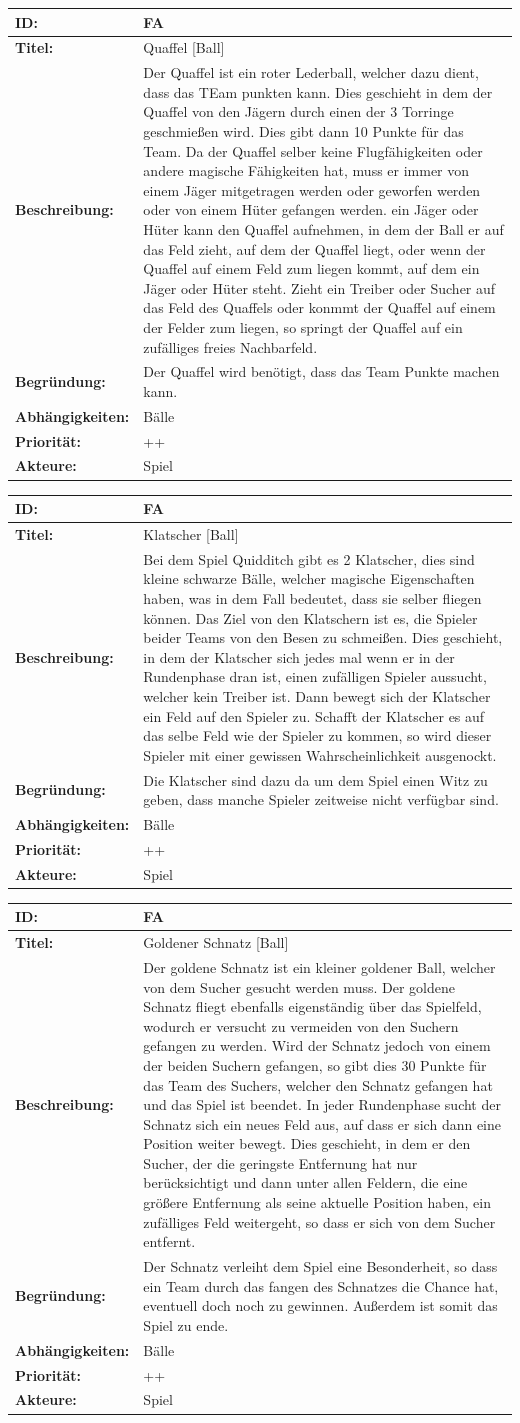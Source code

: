 \documentclass[a4paper,12pt,
headsepline,           %
oneside,               %
pointlessnumbers,      %
bibtotoc,              %
]{scrartcl}
\newcommand{\anf}[7] {
    \begin{table}[H]
        \centering
        \begin{tabular}{|p{3.2cm}|p{11.3cm}|}
        	\hline
            \textbf{ID:} & \textbf{#1} \\ \hline
            \textbf{Titel:} & #2 \\ \hline
            \textbf{Beschreibung:} & #3 \\ \hline
            \textbf{Begründung:} & #4 \\ \hline
            \textbf{Abhängigkeiten:} & #5 \\ \hline
            \textbf{Priorität:} & #6 \\ \hline
            \textbf{Akteure:} & #7 \\ \hline
        \end{tabular}
    \end{table}
}
\newcounter{fanfCount}
\newcommand{\fanf}[6] {
    \stepcounter{fanfCount}
    \anf{FA\thefanfCount}{#1}{#2}{#3}{#4}{#5}{#6}
}
\begin{document}
	\fanf	{Quaffel [Ball]}
			{Der Quaffel ist ein roter Lederball, welcher dazu dient, dass das TEam punkten kann. Dies geschieht in dem der Quaffel von den Jägern durch einen der 3 Torringe geschmießen wird. Dies gibt dann 10 Punkte für das Team. Da der Quaffel selber keine Flugfähigkeiten oder andere magische Fähigkeiten hat, muss er immer von einem Jäger mitgetragen werden oder geworfen werden oder von einem Hüter gefangen werden. ein Jäger oder Hüter kann den Quaffel aufnehmen, in dem der Ball er auf das Feld zieht, auf dem der Quaffel liegt, oder wenn der Quaffel auf einem Feld zum liegen kommt, auf dem ein Jäger oder Hüter steht. Zieht ein Treiber oder Sucher auf das Feld des Quaffels oder konmmt der Quaffel auf einem der Felder zum liegen, so springt der Quaffel auf ein zufälliges freies Nachbarfeld.}
			{Der Quaffel wird benötigt, dass das Team Punkte machen kann.}
			{Bälle}
			{++}
			{Spiel}
	
	\fanf	{Klatscher [Ball]}
			{Bei dem Spiel Quidditch gibt es 2 Klatscher, dies sind kleine schwarze Bälle, welcher magische Eigenschaften haben, was in dem Fall bedeutet, dass sie selber fliegen können. Das Ziel von den Klatschern ist es, die Spieler beider Teams von den Besen zu schmeißen. Dies geschieht, in dem der Klatscher sich jedes mal wenn er in der Rundenphase dran ist, einen zufälligen Spieler aussucht, welcher kein Treiber ist. Dann bewegt sich der Klatscher ein Feld auf den Spieler zu. Schafft der Klatscher es auf das selbe Feld wie der Spieler zu kommen, so wird dieser Spieler mit einer gewissen Wahrscheinlichkeit ausgenockt.}
			{Die Klatscher sind dazu da um dem Spiel einen Witz zu geben, dass manche Spieler zeitweise nicht verfügbar sind.}
			{Bälle}
			{++}
			{Spiel}
	
	\fanf	{Goldener Schnatz [Ball]}

			{Der goldene Schnatz ist ein kleiner goldener Ball, welcher von dem Sucher gesucht werden muss. Der goldene Schnatz fliegt ebenfalls eigenständig über das Spielfeld, wodurch er versucht zu vermeiden von den Suchern gefangen zu werden. Wird der Schnatz jedoch von einem der beiden Suchern gefangen, so gibt dies 30 Punkte für das Team des Suchers, welcher den Schnatz gefangen hat und das Spiel ist beendet. In jeder Rundenphase sucht der Schnatz sich ein neues Feld aus, auf dass er sich dann eine Position weiter bewegt. Dies geschieht, in dem er den Sucher, der die geringste Entfernung hat nur berücksichtigt und dann unter allen Feldern, die eine größere Entfernung als seine aktuelle Position haben, ein zufälliges Feld weitergeht, so dass er sich von dem Sucher entfernt.}
			{Der Schnatz verleiht dem Spiel eine Besonderheit, so dass ein Team durch das fangen des Schnatzes die Chance hat, eventuell doch noch zu gewinnen. Außerdem ist somit das Spiel zu ende.}
			{Bälle}
			{++}
			{Spiel}
	
\end{document}
